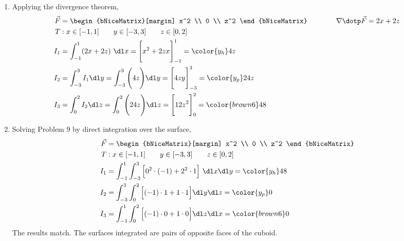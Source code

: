 \begin{enumerate}
     \item Applying the divergence theorem,
           \begin{align}
                \vec{F} & = \begin{bNiceMatrix}[margin]
                                 x^2 \\ 0 \\ z^2
                            \end{bNiceMatrix} \qquad\qquad
                \nabla \dotp \vec{F} = 2x + 2z                                     \\
                T       & : x \in [-1, 1] \qquad y \in [-3, 3] \qquad z \in [0, 2] \\
                I_1     & = \int_{-1}^{1} (2x + 2z) \ \dl x
                = \Bigg[ x^2 + 2zx \Bigg]_{-1}^{1}
                = {\color{y_h} 4z}                                                 \\
                I_2     & = \int_{-3}^{3}I_1 \dl y
                = \int_{-3}^{3} \Bigg( 4z \Bigg) \dl y
                = \Bigg[ 4zy \Bigg]_{-3}^{3}
                = {\color{y_p} 24z }                                               \\
                I_3     & = \int_{0}^{2} I_2 \dl z = \int_{0}^{2}
                \Bigg( 24z \Bigg) \dl z
                = \Bigg[ 12z^2 \Bigg]_{0}^{2}
                = {\color{brown6} 48}
           \end{align}

     \item Solving Problem $ 9 $ by direct integration over the surface,
           \begin{align}
                \vec{F} & = \begin{bNiceMatrix}[margin]
                                 x^2 \\ 0 \\ z^2
                            \end{bNiceMatrix}                             \\
                T       & : x \in [-1, 1] \qquad y \in [-3, 3] \qquad z \in [0, 2] \\
                I_1     & = \int_{-1}^{1} \int_{-3}^{3}
                \Big[ 0^2 \cdot (-1) + 2^2 \cdot 1 \Big] \ \dl x \dl y
                = {\color{y_h} 48}                                                 \\
                I_2     & = \int_{-3}^{3} \int_{0}^{2}
                \Big[ (-1) \cdot 1 + 1 \cdot 1 \Big] \dl y \dl z
                = {\color{y_p} 0}                                                  \\
                I_3     & = \int_{-1}^{1}\int_{0}^{2} \Big[
                     (-1) \cdot 0 + 1 \cdot 0 \Big]  \dl z \dl x
                = {\color{brown6} 0}
           \end{align}
           The results match. The surfaces integrated are pairs of opposite faces
           of the cuboid.


\end{enumerate}
